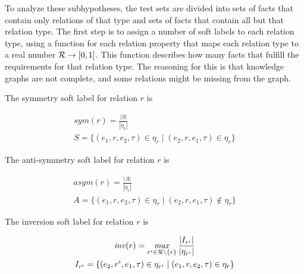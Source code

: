 To analyze these subhypotheses, the test sets are divided into sets of facts that contain only relations of that type and sets of facts that contain all but that relation type. The first step is to assign a number of soft labels to each relation type, using a function for each relation property that maps each relation type to a real number $\mathcal{R} \rightarrow [ 0 , 1 ]$. This function describes how many facts that fulfill the requirements for that relation type. The reasoning for this is that knowledge graphs are not complete, and some relations might be missing from the graph.

The symmetry soft label for relation $r$ is

\begin{equation}
\begin{gathered}
\mathit{sym}(r) = \frac{|S|}{|\eta_r|}\\
S = \{ (e_1, r, e_2, \tau) \in \eta_r \mid (e_2, r, e_1, \tau) \in \eta_r \}
\end{gathered}
\end{equation}

\noindent
The anti-symmetry soft label for relation $r$ is

\begin{equation}
\begin{gathered}
\mathit{asym}(r) = \frac{|A|}{|\eta_r|}\\
A = \{ (e_1, r, e_2, \tau) \in \eta_r \mid (e_2, r, e_1, \tau) \notin \eta_r \}
\end{gathered}
\end{equation}

\noindent
The inversion soft label for relation $r$ is

\begin{equation}
\begin{gathered}
\mathit{inv}(r) = \operatorname*{\mathit{max}}\limits_{r^i \in \mathcal{R} \setminus \{r\} } \frac{|I_{r^i}|}{|\eta_{r^i}|}\\
I_{r^i} = \{ (e_2, r^i, e_1, \tau) \in \eta_{r^i}  \mid (e_1, r, e_2, \tau) \in \eta_r \}
\end{gathered}
\end{equation}



